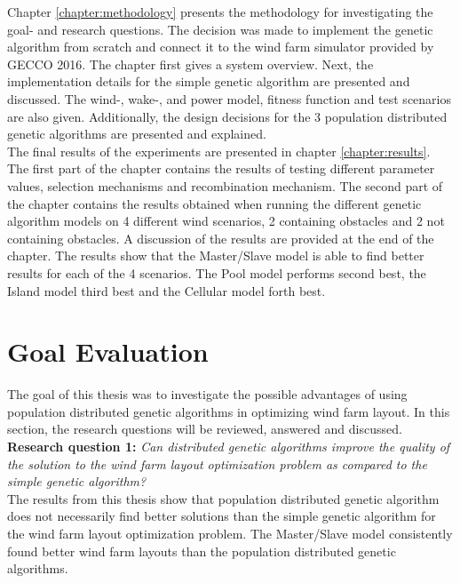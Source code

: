 \noindent Chapter \ref{chapter:methodology} presents the methodology for investigating the goal- and research questions. The decision was made to implement the genetic algorithm from scratch and connect it to the wind farm simulator provided by GECCO 2016. The chapter first gives a system overview. Next, the implementation details for the simple genetic algorithm are presented and discussed. The wind-, wake-, and power model, fitness function and test scenarios are also given. Additionally, the design decisions for the 3 population distributed genetic algorithms are presented and explained.\\


\noindent The final results of the experiments are presented in chapter \ref{chapter:results}. The first part of the chapter contains the results of testing different parameter values, selection mechanisms and recombination mechanism. The second part of the chapter contains the results obtained when running the different genetic algorithm models on 4 different wind scenarios, 2 containing obstacles and 2 not containing obstacles. A discussion of the results are provided at the end of the chapter. The results show that the Master/Slave model is able to find better results for each of the 4 scenarios. The Pool model performs second best, the Island model third best and the Cellular model forth best.\\


\section{Goal Evaluation}\label{section:goal evaluation}


\noindent The goal of this thesis was to investigate the possible advantages of using population distributed genetic algorithms in optimizing wind farm layout. In this section, the research questions will be reviewed, answered and discussed.\\


\noindent \textbf{Research question 1: } \textit{Can distributed genetic algorithms improve the quality of the solution to the wind farm layout optimization problem as compared to the simple genetic algorithm?}\\


\noindent The results from this thesis show that population distributed genetic algorithm does not necessarily find better solutions than the simple genetic algorithm for the wind farm layout optimization problem. The Master/Slave model consistently found better wind farm layouts than the population distributed genetic algorithms. \\


